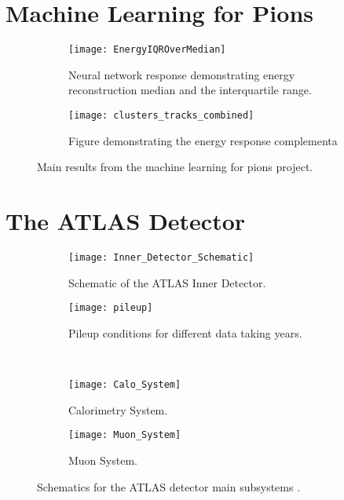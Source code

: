 \documentclass[12pt]{article}
\begin{document}
\clearpage
\newpage
\appendix{}
\section{Machine Learning for Pions}
\begin{figure}[h]
    \centering
    \begin{subfigure}[t]{.48\textwidth}
        \centering
        \texttt{[image: EnergyIQROverMedian]}
        \caption{Neural network response demonstrating energy reconstruction
        median and the interquartile range.}
        \label{sufig:ml4p_energy_response}
    \end{subfigure}
    \hfill
    \begin{subfigure}[t]{.48\textwidth}
        \centering
        \texttt{[image: clusters\_tracks\_combined]}
        \caption{Figure demonstrating the energy response complementa}
        \label{subfig:complimentarity}
    \end{subfigure}
\caption{Main results from the machine learning for pions project.}
\label{fig:ml4p_main_results.}
\end{figure}

\clearpage
\newpage
\section{The ATLAS Detector}
\begin{figure}[h]
    \centering
    \begin{subfigure}[t]{.48\textwidth}
        \centering
        \texttt{[image: Inner\_Detector\_Schematic]}
        \caption{Schematic of the ATLAS Inner Detector.}
        \label{subfig:inner_detector_schematic}
    \end{subfigure}
    \hfill
    \begin{subfigure}[t]{.48\textwidth}
        \centering
        \texttt{[image: pileup]}
        \caption{Pileup conditions for different data taking years.}
        \label{subfig:pileup}
    \end{subfigure}
    ~
    \centering
    \begin{subfigure}[t]{.48\textwidth}
        \centering
        \texttt{[image: Calo\_System]}
        \caption{Calorimetry System.}
        \label{subfig:calo_schematic}
    \end{subfigure}
    \hfill
    \begin{subfigure}[t]{.48\textwidth}
        \centering
        \texttt{[image: Muon\_System]}
        \caption{Muon System.}
        \label{subfig:muon_system_schematic}
    \end{subfigure}
\caption{Schematics for the ATLAS detector main subsystems \cite{Aad_2024}.}
\label{fig:ATLAS_Schematics}
\end{figure}
\end{document}
